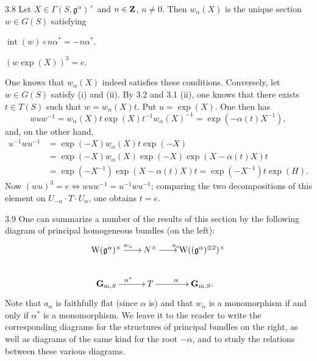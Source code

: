 \begin{corollary}{3.8}\label{XX.3.8}
Let $X\in\Gamma(S,\mathfrak g^\alpha)^\times$ and $n\in\mathbf{Z}$, $n\ne0$. Then $w_\alpha(X)$ is the unique section $w\in G(S)$ satisfying
\begin{enumeratei}
\item $\operatorname{int}(w)\circ n\alpha^*=-n\alpha^*$.
\item $(w\exp(X))^3=e$.
\end{enumeratei}
\end{corollary}
One knows that $w_\alpha(X)$ indeed satisfies these conditions. Conversely, let $w\in G(S)$ satisfy (i) and (ii). By 3.2 and 3.1 (ii), one knows that there exists $t\in T(S)$ such that $w=w_\alpha(X)t$. Put $u=\exp(X)$. One then has
\[
wuw^{-1}=w_\alpha(X)t\exp(X)t^{-1}w_\alpha(X)^{-1}=\exp(-\alpha(t)X^{-1}),
\]
and, on the other hand,
\[
\begin{aligned}
u^{-1}wu^{-1}&=\exp(-X)w_\alpha(X)t\exp(-X)\\
&=\exp(-X)w_\alpha(X)\exp(-X)\exp(X-\alpha(t)X)t\\
&=\exp(-X^{-1})\exp(X-\alpha(t)X)t=\exp(-X^{-1})t\exp(H).
\end{aligned}
\]
Now $(wu)^3=e\Longleftrightarrow wuw^{-1}=u^{-1}wu^{-1}$; comparing the two decompositions of this element on $U_{-\alpha}\cdot T\cdot U_\alpha$, one obtains $t=e$.

\begin{remark}{3.9}\label{XX.3.9}
One can summarize a number of the results of this section by the following diagram of principal homogeneous bundles (on the left):
\[
\xymatrix@C=2em{
\mathrm W(\mathfrak g^\alpha)^\times\ar[r]^{w_\alpha}&N^\times\ar[r]^{a_\alpha}&\mathrm W((\mathfrak g^\alpha)^{\otimes2})^\times\\
\mathbf G_{\mathrm m,S}\ar[r]^{\alpha^*}&T\ar[r]^\alpha&\mathbf G_{\mathrm m,S}.
}
\]
Note that $a_\alpha$ is faithfully flat (since $\alpha$ is) and that $w_\alpha$ is a monomorphism if and only if $\alpha^*$ is a monomorphism. We leave it to the reader to write the corresponding diagrams for the structures of principal bundles on the right, as well as diagrams of the same kind for the root $-\alpha$, and to study the relations between these various diagrams.
\end{remark}

